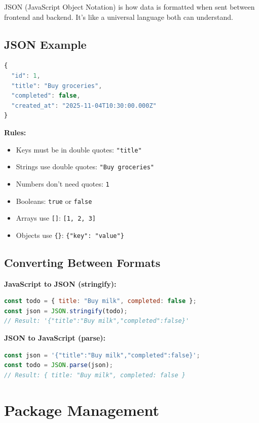\documentclass[12pt,a4paper]{article}
\begin{document}
JSON (JavaScript Object Notation) is how data is formatted when sent between frontend and backend. It's like a universal language both can understand.

\subsection{JSON Example}

\begin{lstlisting}[language=JavaScript, caption=A todo in JSON format]
{
  "id": 1,
  "title": "Buy groceries",
  "completed": false,
  "created_at": "2025-11-04T10:30:00.000Z"
}
\end{lstlisting}

\textbf{Rules:}
\begin{itemize}
    \item Keys must be in double quotes: \texttt{"title"}
    \item Strings use double quotes: \texttt{"Buy groceries"}
    \item Numbers don't need quotes: \texttt{1}
    \item Booleans: \texttt{true} or \texttt{false}
    \item Arrays use \texttt{[]}: \texttt{[1, 2, 3]}
    \item Objects use \texttt{\{\}}: \texttt{\{"key": "value"\}}
\end{itemize}

\subsection{Converting Between Formats}

\textbf{JavaScript to JSON (stringify):}
\begin{lstlisting}[language=JavaScript]
const todo = { title: "Buy milk", completed: false };
const json = JSON.stringify(todo);
// Result: '{"title":"Buy milk","completed":false}'
\end{lstlisting}

\textbf{JSON to JavaScript (parse):}
\begin{lstlisting}[language=JavaScript]
const json = '{"title":"Buy milk","completed":false}';
const todo = JSON.parse(json);
// Result: { title: "Buy milk", completed: false }
\end{lstlisting}

\section{Package Management}
\end{document}
